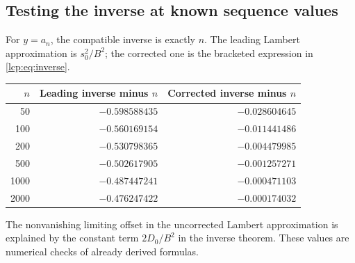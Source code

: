 \documentclass[11pt]{article}
\numberwithin{equation}{section}
\theoremstyle{definition}\newtheorem{definition}[theorem]{Definition}
\theoremstyle{remark}\newtheorem{remark}[theorem]{Remark}
\begin{document}
\subsection{Testing the inverse at known sequence values}
For $y=a_n$, the compatible inverse is exactly $n$.
The leading Lambert approximation is $s_0^2/B^2$; the corrected one
is the bracketed expression in \eqref{lcp:eq:inverse}.
\begin{center}
\begin{tabular}{r r r}
\toprule
$n$ & Leading inverse minus $n$ & Corrected inverse minus $n$\\
\midrule
50   & $-0.598588435$ & $-0.028604645$\\
100  & $-0.560169154$ & $-0.011441486$\\
200  & $-0.530798365$ & $-0.004479985$\\
500  & $-0.502617905$ & $-0.001257271$\\
1000 & $-0.487447241$ & $-0.000471103$\\
2000 & $-0.476247422$ & $-0.000174032$\\
\bottomrule
\end{tabular}
\end{center}
The nonvanishing limiting offset in the uncorrected Lambert approximation
is explained by the constant term $2D_0/B^2$ in the inverse theorem.
These values are numerical checks of already derived formulas.
\end{document}
